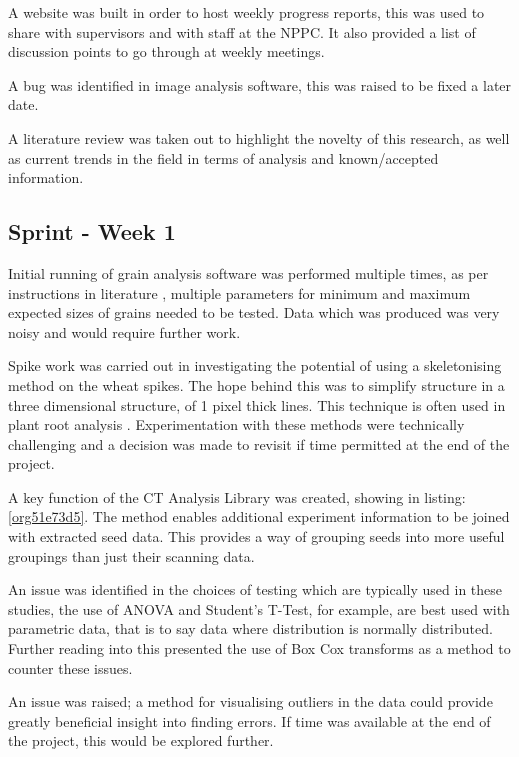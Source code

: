 \documentclass[11pt]{report}
\begin{document}
A website was built in order to host weekly progress reports, this was used to share with supervisors and with staff at the NPPC. It also provided a list of discussion points to go through at weekly meetings.

A bug was identified in image analysis software, this was raised to be fixed a later date.

A literature review was taken out to highlight the novelty of this research, as well as current trends in the field in terms of analysis and known/accepted information.

\subsection{Sprint - Week 1}
\label{sec:orgdb7fa7a}

Initial running of grain analysis software was performed multiple times, as per instructions in literature \cite{Hughes2017}, multiple parameters for minimum and maximum expected sizes of grains needed to be tested. Data which was produced was very noisy and would require further work.

Spike work was carried out in investigating the potential of using a skeletonising method on the wheat spikes. The hope behind this was to simplify structure in a three dimensional structure, of 1 pixel thick lines. This technique is often used in plant root analysis \cite{Mairhofer2015,Daly2017}. Experimentation with these methods were technically challenging and a decision was made to revisit if time permitted at the end of the project.

A key function of the CT Analysis Library was created, showing in listing:\ref{org51e73d5}. The method enables additional experiment information to be joined with extracted seed data. This provides a way of grouping seeds into more useful groupings than just their scanning data.

An issue was identified in the choices of testing which are typically used in these studies, the use of ANOVA and Student's T-Test, for example, are best used with parametric data, that is to say data where distribution is normally distributed. Further reading into this presented the use of Box Cox transforms as a method to counter these issues.

An issue was raised; a method for visualising outliers in the data could provide greatly beneficial insight into finding errors. If time was available at the end of the project, this would be explored further.
\end{document}
